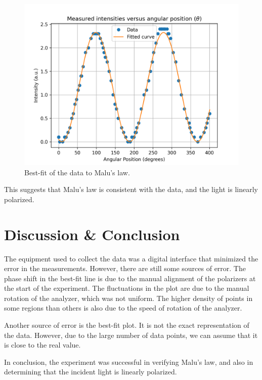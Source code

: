 \documentclass[10pt]{article}
\begin{document}
\begin{figure}[ht]
  \centering
  \includegraphics[scale=0.6]{plots/plot2.png}
  \caption{Best-fit of the data to Malu's law.}
  \label{fig:3}
\end{figure}

This suggests that Malu's law is consistent with the data, and the light is linearly polarized. 
 
\section{Discussion \& Conclusion}

The equipment used to collect the data was a digital interface that minimized the error in the measurements. However, there are still some sources of error. The phase shift in the best-fit line is due to the manual alignment of the polarizers at the start of the experiment. The fluctuations in the plot are due to the manual rotation of the analyzer, which was not uniform. The higher density of points in some regions than others is also due to the speed of rotation of the analyzer.

Another source of error is the best-fit plot. It is not the exact representation of the data. However, due to the large number of data points, we can assume that it is close to the real value.

In conclusion, the experiment was successful in verifying Malu's law, and also in determining that the incident light is linearly polarized.

\printbibliography
\end{document}
